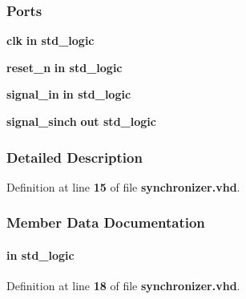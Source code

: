 \subsubsection*{Ports}
 \begin{DoxyCompactItemize}
\item 
{\bf clk}  {\bfseries {\bfseries \textcolor{keywordflow}{in}\textcolor{vhdlchar}{ }}} {\bfseries \textcolor{comment}{std\+\_\+logic}\textcolor{vhdlchar}{ }} 
\item 
{\bf reset\+\_\+n}  {\bfseries {\bfseries \textcolor{keywordflow}{in}\textcolor{vhdlchar}{ }}} {\bfseries \textcolor{comment}{std\+\_\+logic}\textcolor{vhdlchar}{ }} 
\item 
{\bf signal\+\_\+in}  {\bfseries {\bfseries \textcolor{keywordflow}{in}\textcolor{vhdlchar}{ }}} {\bfseries \textcolor{comment}{std\+\_\+logic}\textcolor{vhdlchar}{ }} 
\item 
{\bf signal\+\_\+sinch}  {\bfseries {\bfseries \textcolor{keywordflow}{out}\textcolor{vhdlchar}{ }}} {\bfseries \textcolor{comment}{std\+\_\+logic}\textcolor{vhdlchar}{ }} 
\end{DoxyCompactItemize}


\subsubsection{Detailed Description}


Definition at line {\bf 15} of file {\bf synchronizer.\+vhd}.



\subsubsection{Member Data Documentation}
\paragraph[{clk}]{ {\bfseries \textcolor{keywordflow}{in}\textcolor{vhdlchar}{ }} {\bfseries \textcolor{comment}{std\+\_\+logic}\textcolor{vhdlchar}{ }} \hspace{0.3cm}{\ttfamily [Port]}}\label{classsynchronizer_a4a4609c199d30b3adebbeb3a01276ec5}


Definition at line {\bf 18} of file {\bf synchronizer.\+vhd}.

